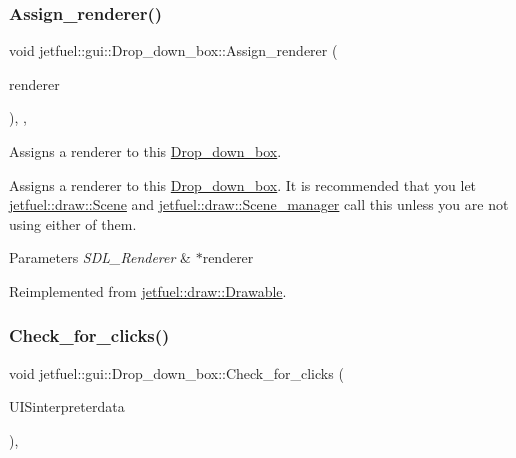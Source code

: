 \subsubsection{\texorpdfstring{Assign\+\_\+renderer()}{Assign\_renderer()}}
{\footnotesize\ttfamily void jetfuel\+::gui\+::\+Drop\+\_\+down\+\_\+box\+::\+Assign\+\_\+renderer (\begin{DoxyParamCaption}\item[{S\+D\+L\+\_\+\+Renderer $\ast$}]{renderer }\end{DoxyParamCaption})\hspace{0.3cm}{\ttfamily [inline]}, {\ttfamily [override]}, {\ttfamily [virtual]}}



Assigns a renderer to this \hyperlink{classjetfuel_1_1gui_1_1Drop__down__box}{Drop\+\_\+down\+\_\+box}. 

Assigns a renderer to this \hyperlink{classjetfuel_1_1gui_1_1Drop__down__box}{Drop\+\_\+down\+\_\+box}. It is recommended that you let \hyperlink{classjetfuel_1_1draw_1_1Scene}{jetfuel\+::draw\+::\+Scene} and \hyperlink{classjetfuel_1_1draw_1_1Scene__manager}{jetfuel\+::draw\+::\+Scene\+\_\+manager} call this unless you are not using either of them.


\begin{DoxyParams}{Parameters}
{\em S\+D\+L\+\_\+\+Renderer} & $\ast$renderer \\
\hline
\end{DoxyParams}


Reimplemented from \hyperlink{classjetfuel_1_1draw_1_1Drawable_a0d7257f197d6ffcdd89c3a99c93d1400}{jetfuel\+::draw\+::\+Drawable}.

\mbox{\label{classjetfuel_1_1gui_1_1Drop__down__box_ae3607405b7e3fe981da75f0529e0a7a1}} 
\subsubsection{\texorpdfstring{Check\+\_\+for\+\_\+clicks()}{Check\_for\_clicks()}}
{\footnotesize\ttfamily void jetfuel\+::gui\+::\+Drop\+\_\+down\+\_\+box\+::\+Check\+\_\+for\+\_\+clicks (\begin{DoxyParamCaption}\item[{\hyperlink{structjetfuel_1_1control_1_1Action}{jetfuel\+::control\+::\+Action}}]{U\+I\+Sinterpreterdata }\end{DoxyParamCaption})\hspace{0.3cm}{\ttfamily [override]}, {\ttfamily [virtual]}}



